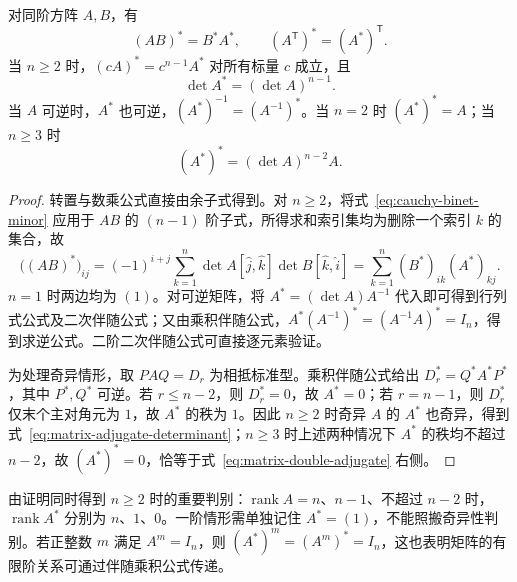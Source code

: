 \begin{theorem}
\label{thm:matrix-adjugate-rules}
对同阶方阵 $A,B$，有
\begin{equation}
 (AB)^*=B^*A^*,\qquad
 (A^{\mathsf T})^*=(A^*)^{\mathsf T}.
 \label{eq:matrix-adjugate-rules}
\end{equation}
当 $n\ge2$ 时，$(cA)^*=c^{n-1}A^*$ 对所有标量 $c$ 成立，且
\begin{equation}
 \det A^*=(\det A)^{n-1}.
 \label{eq:matrix-adjugate-determinant}
\end{equation}
当 $A$ 可逆时，$A^*$ 也可逆，$(A^*)^{-1}=(A^{-1})^*$。当 $n=2$ 时 $(A^*)^*=A$；当 $n\ge3$ 时
\begin{equation}
 (A^*)^*=(\det A)^{n-2}A.
 \label{eq:matrix-double-adjugate}
\end{equation}
\end{theorem}
\begin{proof}
转置与数乘公式直接由余子式得到。对 $n\ge2$，将式~\eqref{eq:cauchy-binet-minor} 应用于 $AB$ 的 $(n-1)$ 阶子式，所得求和索引集均为删除一个索引 $k$ 的集合，故
\[
 \bigl((AB)^*\bigr)_{ij}
 =(-1)^{i+j}\sum_{k=1}^n
 \det A[\widehat j,\widehat k]\det B[\widehat k,\widehat i]
 =\sum_{k=1}^n (B^*)_{ik}(A^*)_{kj}.
\]
$n=1$ 时两边均为 $(1)$。对可逆矩阵，将 $A^*=(\det A)A^{-1}$ 代入即可得到行列式公式及二次伴随公式；又由乘积伴随公式，$A^*(A^{-1})^*=(A^{-1}A)^*=I_n$，得到求逆公式。二阶二次伴随公式可直接逐元素验证。

为处理奇异情形，取 $PAQ=D_r$ 为相抵标准型。乘积伴随公式给出 $D_r^*=Q^*A^*P^*$，其中 $P^*,Q^*$ 可逆。若 $r\le n-2$，则 $D_r^*=0$，故 $A^*=0$；若 $r=n-1$，则 $D_r^*$ 仅末个主对角元为 $1$，故 $A^*$ 的秩为 $1$。因此 $n\ge2$ 时奇异 $A$ 的 $A^*$ 也奇异，得到式~\eqref{eq:matrix-adjugate-determinant}；$n\ge3$ 时上述两种情况下 $A^*$ 的秩均不超过 $n-2$，故 $(A^*)^*=0$，恰等于式~\eqref{eq:matrix-double-adjugate} 右侧。
\end{proof}

由证明同时得到 $n\ge2$ 时的重要判别：$\operatorname{rank}A=n$、$n-1$、不超过 $n-2$ 时，$\operatorname{rank}A^*$ 分别为 $n$、$1$、$0$。一阶情形需单独记住 $A^*=(1)$，不能照搬奇异性判别。若正整数 $m$ 满足 $A^m=I_n$，则 $(A^*)^m=(A^m)^*=I_n$，这也表明矩阵的有限阶关系可通过伴随乘积公式传递。

